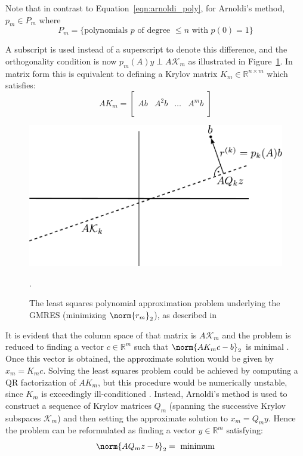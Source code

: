 \noindent Note that in contrast to Equation~\hyperref[eqn:arnoldi_poly]{\ref{eqn:arnoldi_poly}}, for Arnoldi's method, $p_m \in P_m$ where
\begin{equation}
    P_m = \{\text{polynomials } p \text{ of degree } \leq n \text{ with }p(0)=1\}
\end{equation}

\noindent A subscript is used instead of a superscript to denote this difference, and the orthogonality condition is now $p_m(A)y \perp A\mathcal{K}_m$ as illustrated in Figure~\hyperref[fig:gmres]{\ref{fig:gmres}}. In matrix form this is equivalent to defining a Krylov matrix $K_m \in \mathbb{R}^{n \times m}$ which satisfies:
\begin{equation}
\label{eqn:krylov_matrix}
  AK_m =
  \left[
    \begin{array}{c|c|c|c}
      & & & \\
      Ab & A^2b & \dots & A^mb \\
      & & & \\
    \end{array}
  \right] 
\end{equation}

\begin{figure}[h]
    \centering
    \includegraphics[width=0.7\linewidth]{figures/GMRES.pdf}
    \caption{The least squares polynomial approximation problem underlying the GMRES (minimizing $\norm{r_m}_2$), as described in \cite{trefethen_numerical_1997}}.
    \label{fig:gmres}
\end{figure}

\noindent It is evident that the column space of that matrix is $A\mathcal{K}_m$ and the problem is reduced to finding a vector $c \in \mathbb{R}^{m}$ such that $\norm{AK_mc-b}_2$ is minimal   \cite{trefethen_numerical_1997}. Once this vector is obtained, the approximate solution would be given by $x_m =K_mc$. Solving the least squares problem could be achieved by computing a QR factorization of $AK_m$, but this procedure would be numerically unstable, since $K_m$ is exceedingly ill-conditioned \cite{trefethen_numerical_1997}. Instead, Arnoldi's method is used to construct a sequence of Krylov matrices $Q_m$ (spanning the successive Krylov subspaces $\mathcal{K}_m$) and then setting the approximate solution to $x_m = Q_my$. Hence the problem can be reformulated as finding a vector $y \in \mathbb{R}^m$ satisfying:
\begin{equation}
    \norm{AQ_mz-b}_2=\text{ minimum}
\end{equation}

